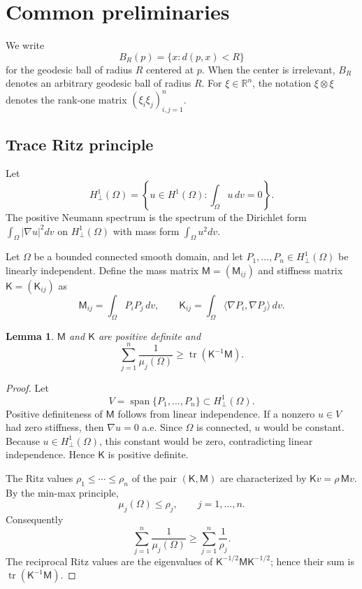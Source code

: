 \documentclass[11pt]{amsart}
\newtheorem{lemma}[theorem]{Lemma}
\theoremstyle{remark}
\DeclareMathOperator{\tr}{tr}
\DeclareMathOperator{\spanop}{span}
\newcommand{\RR}{\mathbb R}
\newcommand{\mcM}{\mathsf M}
\newcommand{\mcK}{\mathsf K}
\begin{document}
\section{Common preliminaries}\label{sec2}

We write
$$
        B_R(p)=\{x:d(p,x)<R\}
$$
for the geodesic ball of radius $R$ centered at $p$.  When the center is irrelevant, $B_R$ denotes an arbitrary geodesic ball of radius $R$.  For $\xi\in\RR^n$, the notation $\xi\otimes\xi$ denotes the rank-one matrix $(\xi_i\xi_j)_{i,j=1}^n$.

\subsection{Trace Ritz principle}

Let
$$
        H^1_{\perp}(\Omega)=\left\{u\in H^1(\Omega):\int_\Omega u\,dv=0\right\}.
$$
The positive Neumann spectrum is the spectrum of the Dirichlet form $\int_\Omega |\nabla u|^2dv$ on $H^1_{\perp}(\Omega)$ with mass form $\int_\Omega u^2dv$.

Let $\Omega$ be a bounded connected smooth domain, and let $P_1,\dots,P_n\in H^1_{\perp}(\Omega)$ be linearly independent.  Define the mass matrix $\mcM=(\mcM_{ij})$ and stiffness matrix $\mcK=(\mcK_{ij})$ as
\begin{equation}\label{eq:hyperbolic-MK-def}
        \mcM_{ij}=\int_\Omega P_iP_j\,dv,
        \qquad
        \mcK_{ij}=\int_\Omega \langle\nabla P_i,\nabla P_j\rangle\,dv.
\end{equation}


\begin{lemma}\label{lem:trace-ritz}
$\mcM$ and $\mcK$ are positive definite and
\begin{equation}\label{eq:trace-ritz}
        \sum_{j=1}^n\frac1{\mu_j(\Omega)}
        \ge \tr(\mcK^{-1}\mcM).
\end{equation}
\end{lemma}

\begin{proof}
Let
$$
        V=\spanop\{P_1,\dots,P_n\}\subset H^1_{\perp}(\Omega).
$$
Positive definiteness of $\mcM$ follows from linear independence.  If a nonzero $u\in V$ had zero stiffness, then $\nabla u=0$ a.e.  Since $\Omega$ is connected, $u$ would be constant.  Because $u\in H^1_{\perp}(\Omega)$, this constant would be zero, contradicting linear independence.  Hence $\mcK$ is positive definite.

The Ritz values $\rho_1\le\cdots\le\rho_n$ of the pair $(\mcK,\mcM)$ are characterized by
$
        \mcK v=\rho\,\mcM v 
$.  By the min-max principle,
$$
        \mu_j(\Omega)\le \rho_j,
        \qquad j=1,\dots,n.
$$
Consequently
$$
        \sum_{j=1}^n\frac1{\mu_j(\Omega)}
        \ge \sum_{j=1}^n\frac1{\rho_j}.
$$
The reciprocal Ritz values are the eigenvalues of $\mcK^{-1/2}\mcM\mcK^{-1/2}$; hence their sum is $\tr(\mcK^{-1}\mcM)$.
\end{proof}
\end{document}
